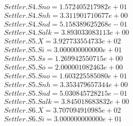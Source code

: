 \begin{align*}
    Settler.S4.Sno = 1.572405217982e+01\\
    Settler.S4.Snh = 3.311901710677e+00\\
    Settler.S4.Snd = 5.158389625268e-01\\
    Settler.S4.Salk = 3.893033083113e+00\\
    Settler.S5.X = 3.927733554733e+02\\
    Settler.S5.Si = 3.000000000000e+01\\
    Settler.S5.Ss = 1.269942550715e+00\\
    Settler.S5.So = 2.000001082463e+00\\
    Settler.S5.Sno = 1.603225585080e+01\\
    Settler.S5.Snh = 3.353479657344e+00\\
    Settler.S5.Snd = 5.030845728215e-01\\
    Settler.S5.Salk = 3.845018683832e+00\\
    Settler.S6.X = 3.707094910985e+02\\
    Settler.S6.Si = 3.000000000000e+01\\
\end{align*}

